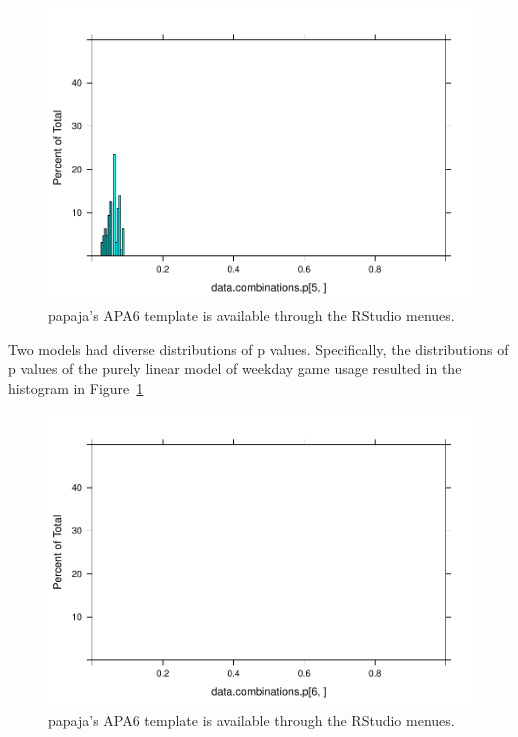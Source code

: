 \documentclass[floatsintext,man]{apa6}
\theoremstyle{definition}
\theoremstyle{definition}
\theoremstyle{definition}
\theoremstyle{remark}
\begin{document}
\begin{figure}

{\centering \includegraphics{stats_6_report_semifinal-3_files/figure-latex/Histdatadriven5-1} 

}

\caption{papaja's APA6 template is available through the RStudio menues.}\label{fig:Histdatadriven5}
\end{figure}

Two models had diverse distributions of p values. Specifically, the
distributions of p values of the purely linear model of weekday game
usage resulted in the histogram in Figure~\ref{fig:Histdatadriven5}

\begin{figure}

{\centering \includegraphics{stats_6_report_semifinal-3_files/figure-latex/Histdatadriven6-1} 

}

\caption{papaja's APA6 template is available through the RStudio menues.}\label{fig:Histdatadriven6}
\end{figure}
\end{document}
